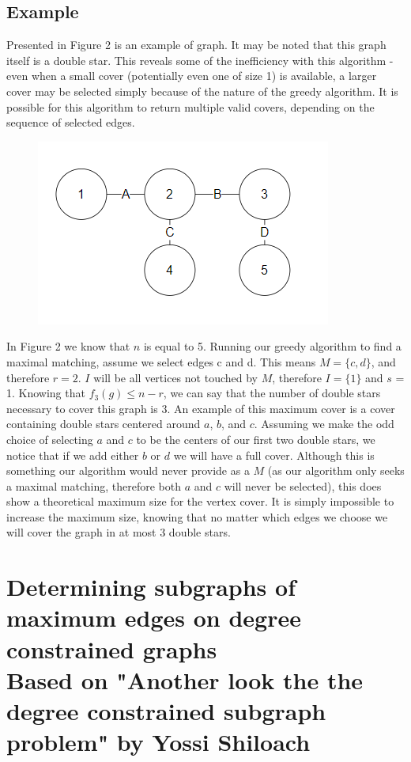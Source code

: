 \documentclass{article}
\begin{document}
		\subsection{Example}
		Presented in Figure 2 is an example of graph. It may be noted that this graph itself is a double star. This reveals some of the inefficiency with this algorithm - even when a small cover (potentially even one of size 1) is available, a larger cover may be selected simply because of the nature of the greedy algorithm. It is possible for this algorithm to return multiple valid covers, depending on the sequence of selected edges.
		 \\
				\begin{figure}[H]
				\caption{}
				\includegraphics{Figure2}
			\end{figure}
			In Figure 2 we know that $n$ is equal to 5. Running our greedy algorithm to find a maximal matching, assume we select edges c and d. This means $M = \{c,d\}$, and therefore $r = 2$. $I$ will be all vertices not touched by $M$, therefore $I = \{1\}$ and $s$ = 1. Knowing that $f_{3}(g) \leq n-r$, we can say that the  number of double stars necessary to cover this graph is 3. An example of this maximum cover is a cover containing double stars centered around $a$, $b$, and $c$. Assuming we make the odd choice of selecting $a$ and $c$ to be the centers of our first two double stars, we notice that if we add either $b$ or $d$ we will have a full cover. Although this is something our algorithm would never provide as a $M$ (as our algorithm only seeks a maximal matching, therefore both $a$ and $c$ will never be selected), this does show a theoretical maximum size for the vertex cover. It is simply impossible to increase the maximum size, knowing that no matter which edges we choose we will cover the graph in at most 3 double stars.
			
	\section{Determining subgraphs of maximum edges on degree constrained graphs \\ {\small Based on "Another look the the degree constrained subgraph problem" by Yossi Shiloach \cite{2}}  }
\end{document}
